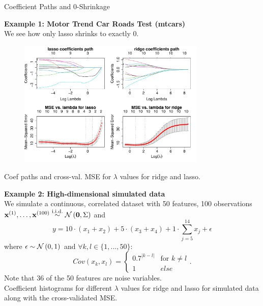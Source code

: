 \documentclass[11pt,compress,t,notes=noshow, xcolor=table]{beamer}
\begin{document}
\begin{vbframe}{Coefficient Paths and 0-Shrinkage}

\textbf{Example 1: Motor Trend Car Roads Test (mtcars)} \\

We see how only lasso shrinks to exactly 0.

\begin{figure}
\includegraphics[width=0.8\textwidth]{figure_man/l1_l2_regupaths_mse.pdf}\\
\end{figure}
\vspace{-0.3cm}
Coef paths and cross-val. MSE for $\lambda$ values for ridge and lasso.

\framebreak
\textbf{Example 2: High-dimensional simulated data} \\
We simulate a continuous, correlated dataset with 50 features, 100 observations $\mathbf{x}^{(1)},\dots, \mathbf{x}^{(100)} \overset{\text{i.i.d.}}{\sim} \mathcal{N} \left(\mathbf{0}, \Sigma \right)$ and 
$$ y = 10 \cdot (x_1 + x_2) + 5 \cdot (x_3 + x_4) + 1 \cdot \sum_{j = 5}^{14} x_j + \epsilon $$
where $\epsilon \sim \mathcal{N} \left(0, 1\right)$ and $ \forall k, l \in \{1, ..., 50\}$: 
$$Cov(x_k, x_l) = 
  \begin{cases}
   0.7^{|k-l|} & \text{for } k \neq l \\
   1 & else 
   \end{cases}. 
$$ 
Note that 36 of the 50 features are noise variables. \\
\framebreak 
Coefficient histograms for different $\lambda$ values for ridge and lasso for simulated data along with the cross-validated MSE.


\end{vbframe}
\end{document}
